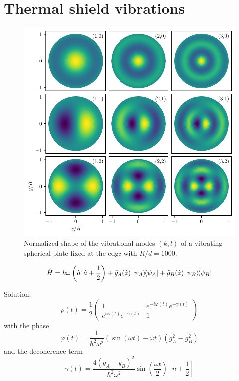 \section{Thermal shield vibrations}\label{sec:4:thermal-vibrations}

\begin{figure}[!htbp]
  \centering
  \includegraphics[width=\textwidth]{./../figures/vibrations/vibrational-modes.pdf}
  \caption{Normalized shape of the vibrational modes $(k,l)$ of a vibrating spherical plate fixed at the edge with $R/d = 1000$.}
  \label{fig:4:vibrational-modes}
\end{figure}



\begin{equation}
  \hat{H} = \hbar \omega \left(\hat{a}^\dagger\hat{a} + \frac{1}{2}\right) + \tilde{g}_A(\hat{z}) \ketbra{\psi_A} + \tilde{g}_B(\hat{z}) \ketbra{\psi_B}
\end{equation}

Solution:
\begin{equation}
  \rho(t) = \frac{1}{2}\begin{pmatrix}
    1 & e^{-i\varphi(t)}e^{-\gamma(t)}\\
    e^{i\varphi(t)}e^{-\gamma(t)} & 1
  \end{pmatrix}
\end{equation}
with the phase
\begin{equation}
  \varphi(t) = \frac{1}{\hbar^2\omega^2} \left(\sin(\omega t) - \omega t\right) \left(g_A^2 - g_B^2\right)
\end{equation}
and the decoherence term
\begin{equation}
  \gamma(t) = \frac{4(g_A - g_B)^2}{\hbar^2 \omega^2} \sin(\frac{\omega t}{2}) \left[\bar{n} + \frac{1}{2}\right]
\end{equation}

